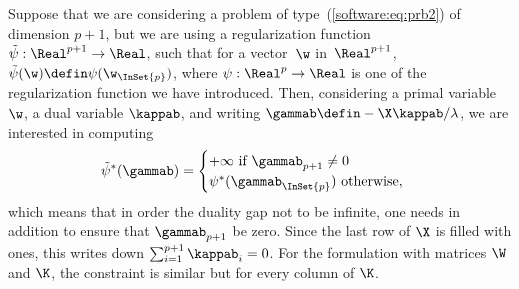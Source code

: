 \documentclass[a4paper, 11pt]{article}
\begin{document}
Suppose that we are considering a problem of
type~(\ref{software:eq:prb2}) of dimension $p+1$, but we are using a
regularization function $\tilde{\psi}: \Real^{p+1} \to \Real$, such that for a
vector~$\w$ in~$\Real^{p+1}$, $\tilde{\psi}(\w) \defin \psi(\w_{\InSet{p}})$,
where $\psi: \Real^p \to \Real$ is one of the regularization function we have
introduced. Then, considering a primal variable $\w$, a dual variable $\kappab$, 
and writing $\gammab\defin-\X\kappab/\lambda$, we are interested in computing
\begin{displaymath}
   \tilde{\psi}^\ast(\gammab) = \begin{cases}
      +\infty ~\text{if}~ \gammab_{p+1} \neq 0 \\
      \psi^\ast(\gammab_{\InSet{p}}) ~\text{otherwise},
   \end{cases}
\end{displaymath}
which means that in order the duality gap not to be infinite, one needs in addition to ensure
that $\gammab_{p+1}$ be zero. Since the last row of $\X$ is filled with ones, this writes
down $\sum_{i=1}^{p+1} \kappab_{i}=0$.
For the formulation with matrices $\W$ and $\K$, the constraint is similar but for every
column of $\K$.
\end{document}
